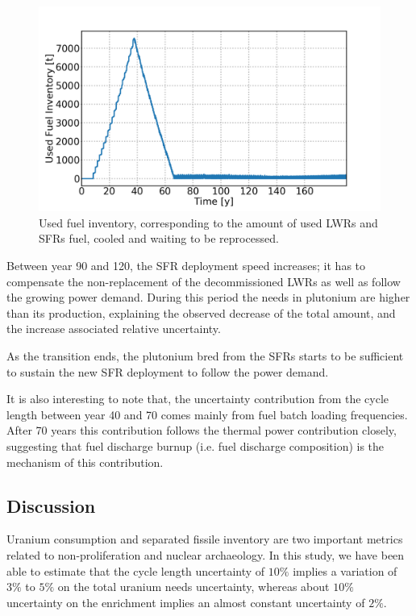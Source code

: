 \documentclass{anstrans}
\begin{document}
\begin{figure}[t] %
    \centering
    \includegraphics[scale=0.16]{used_fuel}
    \caption{Used fuel inventory, corresponding to the amount of used
    \glspl{LWR} and \glspl{SFR} fuel, cooled and waiting to be reprocessed.}
    \label{fig:used_fuel}
\end{figure}
Between year 90 and 120, the \gls{SFR} deployment speed increases; it has to
compensate the non-replacement of the decommissioned \glspl{LWR} as well as
follow the growing power demand.  During this period the needs in plutonium are higher
than its production, explaining the observed decrease of the total amount, and
the increase associated relative uncertainty.

As the transition ends, the plutonium bred from the \glspl{SFR} starts to be
sufficient to sustain the new \gls{SFR} deployment to follow the power demand.

It is also interesting to note that, the uncertainty contribution from the cycle
length between year 40 and 70 comes mainly from fuel batch loading
frequencies.  After 70 years this contribution follows the thermal
power contribution closely, suggesting that fuel discharge burnup (i.e.  fuel
discharge composition) is the mechanism of this contribution.

\subsection{Discussion}

Uranium consumption and separated fissile inventory are two important metrics
related to non-proliferation and nuclear archaeology.  In this study, we have
been able to estimate that the cycle length uncertainty of $10\%$ implies a
variation of $3\%$ to $5\%$ on the total uranium needs uncertainty, whereas about
$10\%$ uncertainty on the enrichment implies an almost constant uncertainty of $2\%$.
\end{document}
